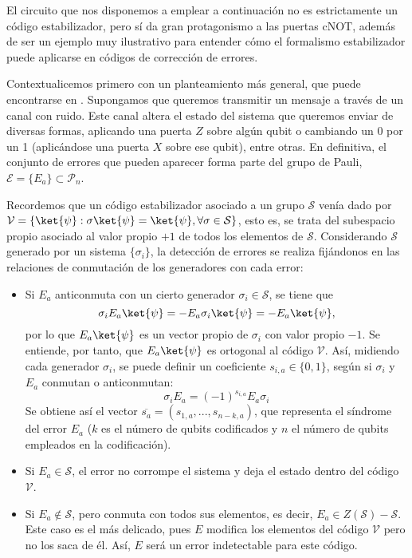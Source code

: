 \documentclass[11pt,a4paper,twoside,pdf]{article}
\numberwithin{equation}{section}
\begin{document}
			El circuito que nos disponemos a emplear a continuación no es estrictamente un código estabilizador, pero sí da gran protagonismo a las puertas cNOT, además de ser un ejemplo muy ilustrativo para entender cómo el formalismo estabilizador puede aplicarse en códigos de corrección de errores.
			
			Contextualicemos primero con un planteamiento más general, que puede encontrarse en \cite{QEC II}. Supongamos que queremos transmitir un mensaje a través de un canal con ruido. Este canal altera el estado del sistema que queremos enviar de diversas formas, aplicando una puerta $Z$ sobre algún qubit o cambiando un 0 por un 1 (aplicándose una puerta $X$ sobre ese qubit), entre otras. En definitiva, el conjunto de errores que pueden aparecer forma parte del grupo de Pauli, $\mathcal{E}=\{E_a\} \subset \mathcal{P}_n$.
			
			Recordemos que un código estabilizador asociado a un grupo $\mathcal{S}$ venía dado por $\mathcal{V}=\{ \ket{\psi} : \sigma \ket{\psi} = \ket{\psi} , \forall \sigma \in \mathcal{S} \}$, esto es, se trata del subespacio propio asociado al valor propio $+1$ de todos los elementos de $\mathcal{S}$. Considerando $\mathcal{S}$ generado por un sistema $\{\sigma_i\}$, la detección de errores se realiza fijándonos en las relaciones de conmutación de los generadores con cada error:
			
			\begin{itemize}[leftmargin=0.6cm]
			
				\item Si $E_a$ anticonmuta con un cierto generador $\sigma_i \in \mathcal{S}$, se tiene que 
								\[ \sigma_i E_a \ket{\psi} = - E_a\sigma_i \ket{\psi}  =-E_a \ket{\psi},  \]
				por lo que $E_a\ket{\psi}$ es un vector propio de $\sigma_i$ con valor propio $-1$. Se entiende, por tanto, que $E_a\ket{\psi}$	es ortogonal al código $\mathcal{V}$. Así, midiendo cada generador $\sigma_i$, se puede definir un coeficiente $s_{i,a}\in\{0,1\}$, según si $\sigma_i$ y $E_a$ conmutan o anticonmutan:
								\[ \sigma_i E_a = (-1)^{s_{i,a}} E_a \sigma_i \]
				Se obtiene así el vector $\overline{s_a}=(s_{1,a},...,s_{n-k,a})$, que representa el síndrome del error $E_a$ ($k$ es el número de qubits codificados y $n$ el número de qubits empleados en la codificación).			
				
				\item Si $E_a \in \mathcal{S}$, el error no corrompe el sistema y deja el estado dentro del código $\mathcal{V}$.
				
				\item Si $E_a \notin \mathcal{S}$, pero conmuta con todos sus elementos, es decir, $E_a \in Z(\mathcal{S})-\mathcal{S}$. Este caso es el más delicado, pues $E$ modifica los elementos del código $\mathcal{V}$ pero no los saca de él. Así, $E$ será un error indetectable para este código.
				
			\end{itemize}	
		
\end{document}
